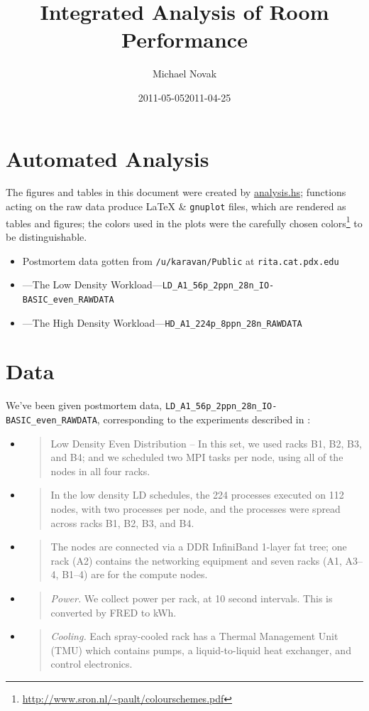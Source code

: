 \documentclass[10pt]{report}
\title{Integrated Analysis of Room Performance}
\author{Michael Novak} %
\begin{document}
  \maketitle
\section{Automated Analysis}
The figures and tables in this document were created by \href{run:analysis.hs}{analysis.hs}; functions acting on the raw data produce \LaTeX{} \& {\tt gnuplot} files, which are rendered as tables and figures; 
the colors used in the plots were the carefully chosen colors\footnote{\url{http://www.sron.nl/~pault/colourschemes.pdf}} to be distinguishable. 


\begin{itemize}
  \item Postmortem data gotten from \verb=/u/karavan/Public= at \verb=rita.cat.pdx.edu=
  \item \date{2011-05-05}---The Low Density Workload---\verb=LD_A1_56p_2ppn_28n_IO-BASIC_even_RAWDATA=
  \item \date{2011-04-25}---The High Density Workload---\verb=HD_A1_224p_8ppn_28n_RAWDATA=
\end{itemize}

\section{Data}
We've been given postmortem data, \verb=LD_A1_56p_2ppn_28n_IO-BASIC_even_RAWDATA=, corresponding to the experiments described in \cite{Karavanic2011}:
\begin{itemize}
  \item
 \begin{quote}
Low Density Even Distribution -- In this set, we used
racks B1, B2, B3, and B4; and we scheduled two MPI
tasks per node, using all of the nodes in all four racks.
 \end{quote}
 \item
\begin{quote}
In the low density LD schedules, the 224 processes executed on 112 nodes, with two processes per node, and the processes were spread across racks B1, B2, B3, and B4.
 \end{quote}  
 \item
   \begin{quote}
     The nodes are connected via a DDR InfiniBand 1-layer fat tree; one rack (A2) contains the networking equipment and seven racks (A1, A3--4, B1--4) are for the compute nodes.
   \end{quote}
 \item
   \begin{quote}
     \emph{Power.} We collect power per rack, at 10 second intervals. This is converted by FRED to kWh.
   \end{quote}
 \item
   \begin{quote}
     \emph{Cooling.} Each spray-cooled rack has a Thermal Management Unit (TMU) which contains pumps, a liquid-to-liquid heat exchanger, and control electronics.
   \end{quote}
 \end{itemize}
\end{document}
